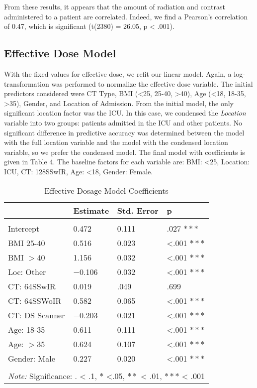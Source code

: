 \documentclass[]{article}
\begin{document}
From these results, it appears that the amount of radiation and contrast
administered to a patient are correlated. Indeed, we find a Pearson's
correlation of 0.47, which is significant (t(2380) = 26.05, p
\textless{} .001).

\subsection{Effective Dose Model}\label{effective-dose-model}

With the fixed values for effective dose, we refit our linear model.
Again, a log-transformation was performed to normalize the effective
dose variable. The initial predictors considered were CT Type, BMI
(\textless{}25, 25-40, \textgreater{}40), Age (\textless{}18, 18-35,
\textgreater{}35), Gender, and Location of Admission. From the initial
model, the only significant location factor was the ICU. In this case,
we condensed the \textit{Location} variable into two groups: patients
admitted in the ICU and other patients. No significant difference in
predictive accuracy was determined between the model with the full
location variable and the model with the condensed location variable, so
we prefer the condensed model. The final model with coefficients is
given in Table 4. The baseline factors for each variable are: BMI:
\textless{}25, Location: ICU, CT: 128SSwIR, Age: \textless{}18, Gender:
Female.

\begin{table}[H] \centering 
  \caption{Effective Dosage Model Coefficients} 
\begin{tabular}{p{3cm}|p{3cm}p{3cm}p{3cm}}
\\[-1.8ex] \hline 
\hline
    & Estimate & Std. Error & p  \\
\hline \\[-1.8ex] 
 Intercept   & 0.472 & 0.111 & .027 $***$ \\
 BMI 25-40   & 0.516 & 0.023 & <.001 $***$\\
 BMI $>$40   & 1.156 & 0.032 & <.001 $***$\\
 Loc: Other  & $-$0.106 & 0.032 & <.001 $***$\\
 CT: 64SSwIR & 0.019 & .049 & .699  \\
 CT: 64SSWoIR & 0.582 & 0.065 & <.001 $***$ \\
 CT: DS Scanner &$-$0.203 & 0.021 & <.001 $***$ \\
 Age: 18-35 & 0.611 & 0.111 & <.001 $***$\\
 Age: $>$35 & 0.624 & 0.107 & <.001 $***$ \\
 Gender: Male & 0.227 & 0.020 & <.001 $***$ \\
\hline 
\hline \\[-1.8ex]
\multicolumn{4}{l}{\textit{Note:} Significance: $.$ < .1, $*$ <.05, $**$ < .01, $***$ < .001}
 \end{tabular}
\end{table}
\end{document}
